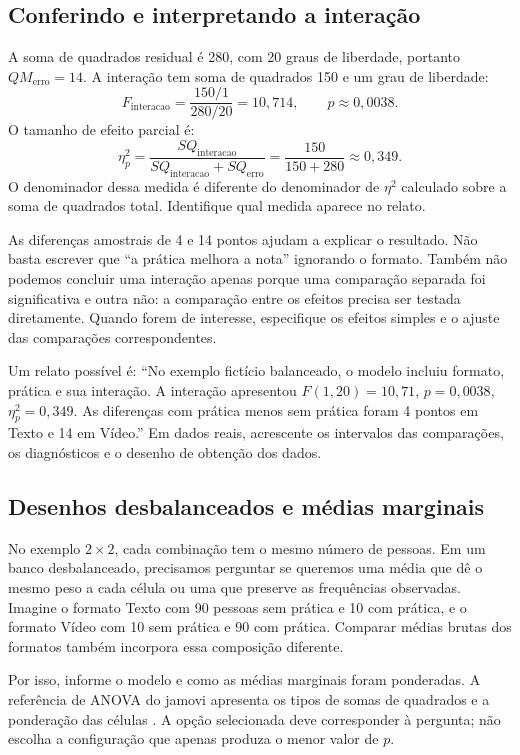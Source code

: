 \subsection{Conferindo e interpretando a interação}

A soma de quadrados residual é 280, com 20 graus de liberdade, portanto $QM_{\mathrm{erro}}=14$. A interação tem soma de quadrados 150 e um grau de liberdade:
\[
F_{\mathrm{interacao}}=\frac{150/1}{280/20}=10{,}714,
\qquad p\approx0{,}0038.
\]
O tamanho de efeito parcial é:
\[
\eta_p^2=\frac{SQ_{\mathrm{interacao}}}
{SQ_{\mathrm{interacao}}+SQ_{\mathrm{erro}}}
=\frac{150}{150+280}\approx0{,}349.
\]
O denominador dessa medida é diferente do denominador de $\eta^2$ calculado sobre a soma de quadrados total. Identifique qual medida aparece no relato.

As diferenças amostrais de 4 e 14 pontos ajudam a explicar o resultado. Não basta escrever que ``a prática melhora a nota'' ignorando o formato. Também não podemos concluir uma interação apenas porque uma comparação separada foi significativa e outra não: a comparação entre os efeitos precisa ser testada diretamente. Quando forem de interesse, especifique os efeitos simples e o ajuste das comparações correspondentes.

Um relato possível é: ``No exemplo fictício balanceado, o modelo incluiu formato, prática e sua interação. A interação apresentou $F(1,20)=10{,}71$, $p=0{,}0038$, $\eta_p^2=0{,}349$. As diferenças com prática menos sem prática foram 4 pontos em Texto e 14 em Vídeo.'' Em dados reais, acrescente os intervalos das comparações, os diagnósticos e o desenho de obtenção dos dados.

\subsection{Desenhos desbalanceados e médias marginais}

No exemplo $2\times2$, cada combinação tem o mesmo número de pessoas. Em um banco desbalanceado, precisamos perguntar se queremos uma média que dê o mesmo peso a cada célula ou uma que preserve as frequências observadas. Imagine o formato Texto com 90 pessoas sem prática e 10 com prática, e o formato Vídeo com 10 sem prática e 90 com prática. Comparar médias brutas dos formatos também incorpora essa composição diferente.

Por isso, informe o modelo e como as médias marginais foram ponderadas. A referência de ANOVA do jamovi apresenta os tipos de somas de quadrados e a ponderação das células \parencite{JamoviAnovaFatorial}. A opção selecionada deve corresponder à pergunta; não escolha a configuração que apenas produza o menor valor de $p$.

